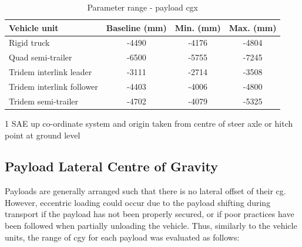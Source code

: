 \begin{table}[H]
	\centering\footnotesize
	\begin{threeparttable}

		\begin{tabulary}{\textwidth}{lccc}
			\toprule
			\textbf{Vehicle unit} & \textbf{Baseline (mm)} & \textbf{Min. (mm)} & \textbf{Max. (mm)} \\

			\midrule
             Rigid truck & -4490 & -4176 & -4804 \\
             Quad semi-trailer & -6500 & -5755 & -7245 \\
             Tridem interlink leader & -3111 & -2714 & -3508 \\
             Tridem interlink follower & -4403 & -4006 & -4800 \\
             Tridem semi-trailer & -4702 & -4079 & -5325 \\
			\bottomrule
		\end{tabulary}

		\caption{Parameter range - payload \gls{cgx}}
		\label{table:cgx-variation-for-payloads}

		\begin{tablenotes}
			\item[1] SAE up co-ordinate system and origin taken from centre of steer axle or hitch point at ground level
		\end{tablenotes}

	\end{threeparttable}
\end{table}

\subsection{Payload Lateral Centre of Gravity}\label{section:pr-cgy-payload}

Payloads are generally arranged such that there is no lateral offset of their \gls{cg}. However, eccentric loading could occur due to the payload shifting during transport if the payload has not been properly secured, or if poor practices have been followed when partially unloading the vehicle. Thus, similarly to the vehicle units, the range of \gls{cgy} for each payload was evaluated as follows:

